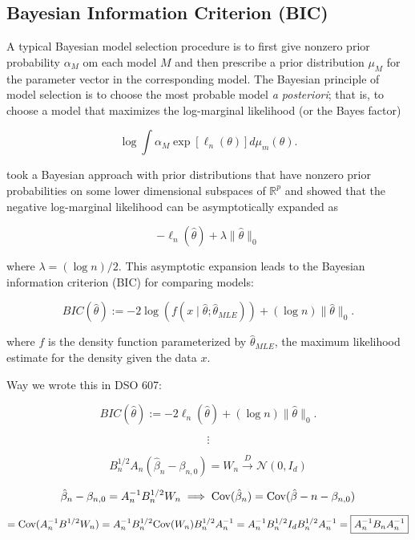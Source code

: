 \subsection{Bayesian Information Criterion (BIC)}\label{linreg.bic}

A typical Bayesian model selection procedure is to first give nonzero prior probability \(\alpha_M\) om each model \(M\) and then prescribe a prior distribution \(\mu_M\) for the parameter vector in the corresponding model. The Bayesian principle of model selection is to choose the most probable model \textit{a posteriori}; that is, to choose a model that maximizes the log-marginal likelihood (or the Bayes factor)

\[
\log \int \alpha_M \exp [ \ell_n (\theta)] d \mu_m(\theta).
\]

\citet{Schwarz1978} took a Bayesian approach with prior distributions that have nonzero prior probabilities on some lower dimensional subspaces of \(\mathbb{R}^p\) and showed that the negative log-marginal likelihood can be asymptotically expanded as 

\[
-\ell_n(\hat{\theta}) + \lambda \lVert \hat{\theta} \rVert_0
\]

where \(\lambda = (\log n)/2\). This asymptotic expansion leads to the Bayesian information criterion (BIC) for comparing models:

\[
BIC(\hat{\theta}) := -2 \log \left(f( x \mid \hat{\theta}; \hat{\theta}_{MLE}) \right) + (\log n) \lVert \hat{\theta} \rVert_0.
\]

where \(f\) is the density function parameterized by \( \hat{\theta}_{MLE}\), the maximum likelihood estimate for the density given the data \(x\). 


Way we wrote this in DSO 607:

\[
BIC(\hat{\theta}) := -2 \ell_n (\hat{\theta}) + (\log n) \lVert \hat{\theta} \rVert_0.
\]

\[
\vdots
\]


\[
B_n^{1/2} A_n(\hat{\beta}_n - \beta_{n,0} ) = W_n \xrightarrow{D} \mathcal{N}(0, I_d)
\]

\[
\hat{\beta}_n - \beta_{n,0} = A_n^{-1} B_n^{1/2} W_n \implies \mathrm{Cov}(\hat{\beta}_n) = \mathrm{Cov}(\hat{\beta}-n - \beta_{n,0})
\]

\[ 
= \mathrm{Cov}(A_n^{-1} B^{1/2} W_n) = A_n^{-1}B_n^{1/2} \mathrm{Cov}(W_n) B_n^{1/2} A_n^{-1} = A_n^{-1}B_n^{1/2} I_d B_n^{1/2} A_n^{-1} = \boxed{A_n^{-1} B_n A_n^{-1}}
\]

